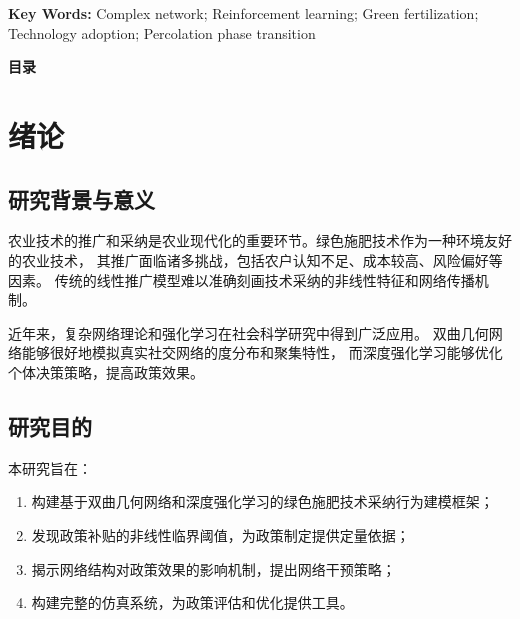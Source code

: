\documentclass[12pt,a4paper]{article}
\newcommand{\heiti}{\CJKfamily{zhhei}}  %
\numberwithin{equation}{section}
\begin{document}
\vspace{1\baselineskip}  %

{\bfseries Key Words:} Complex network; Reinforcement learning; Green fertilization; Technology adoption; Percolation phase transition

\newpage

\thispagestyle{frontmatter}

\begin{center}
    {\fontsize{18}{18}\bfseries\heiti 目录}
\end{center}

\vspace{0.5\baselineskip}

\tableofcontents

\newpage

\pagestyle{fancy}
\fancyfoot[C]{\small --\thepage--}
\setcounter{page}{1}  %

\section{绪论}

\subsection{研究背景与意义}

农业技术的推广和采纳是农业现代化的重要环节。绿色施肥技术作为一种环境友好的农业技术，
其推广面临诸多挑战，包括农户认知不足、成本较高、风险偏好等因素。
传统的线性推广模型难以准确刻画技术采纳的非线性特征和网络传播机制。

近年来，复杂网络理论和强化学习在社会科学研究中得到广泛应用。
双曲几何网络能够很好地模拟真实社交网络的度分布和聚集特性，
而深度强化学习能够优化个体决策策略，提高政策效果。

\subsection{研究目的}

本研究旨在：
\begin{enumerate}
    \item 构建基于双曲几何网络和深度强化学习的绿色施肥技术采纳行为建模框架；
    \item 发现政策补贴的非线性临界阈值，为政策制定提供定量依据；
    \item 揭示网络结构对政策效果的影响机制，提出网络干预策略；
    \item 构建完整的仿真系统，为政策评估和优化提供工具。
\end{enumerate}
\end{document}
